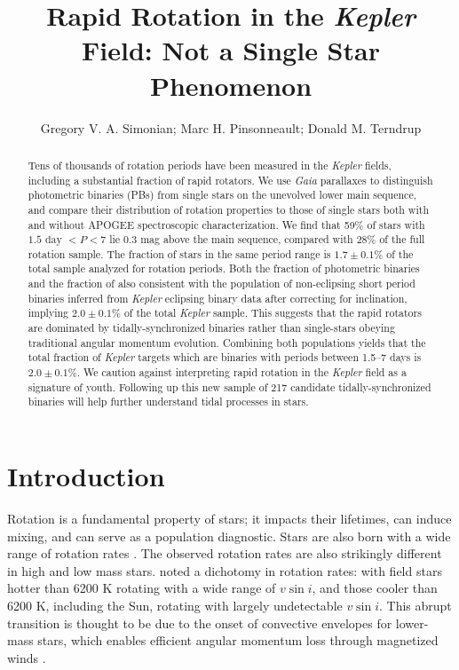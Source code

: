 \documentclass[manuscript]{aastex6}
\newcommand{\vsini}{\ensuremath{v \sin i}}
\newcommand{\Kepler}{\mbox{\textit{Kepler}}}
\newcommand{\Gaia}{\mbox{\textit{Gaia}}}
\begin{document}
\title{Rapid Rotation in the \Kepler{} Field: Not a Single Star
Phenomenon}
\author{Gregory V. A. Simonian; Marc H. Pinsonneault; Donald M. Terndrup}

\begin{abstract}
    Tens of thousands of rotation periods have been measured in the
    \Kepler{} fields, including a substantial fraction of rapid rotators. We 
    use \Gaia{} parallaxes to distinguish photometric binaries (PBs) from
    single stars on the unevolved lower main sequence, and compare their
    distribution of rotation properties to those of single stars both with and 
    without APOGEE spectroscopic characterization. We find that 59\% of stars
    with \(1.5 \textrm{ day } < P < 7\) lie 0.3 mag above the main
    sequence, compared with 28\% of the full rotation sample. The fraction of 
    stars in the same period range is \(1.7 \pm 0.1\%\) of the total sample 
    analyzed for rotation periods. Both the fraction of photometric binaries
    and the fraction of  also consistent with the population of non-eclipsing short period 
    binaries inferred from \Kepler{} eclipsing binary data after correcting for 
    inclination, implying \(2.0 \pm 0.1\%\) of the total \Kepler{} sample. This suggests that the rapid rotators 
    are dominated by tidally-synchronized binaries rather than single-stars 
    obeying traditional angular momentum evolution. Combining both populations
    yields that the total fraction of \Kepler{} targets which are binaries with 
    periods between 1.5--7 days is \(2.0 \pm 0.1\%\). We caution against 
    interpreting rapid rotation in the \Kepler{} field as a signature of youth. 
    Following up this new sample of 217 candidate tidally-synchronized binaries 
    will help further understand tidal processes in stars.
\end{abstract}

\section{Introduction}

Rotation is a fundamental property of stars; it impacts their lifetimes, can
induce mixing, and can serve as a population diagnostic. Stars are also born 
with a wide range of rotation rates \citep{Attridge92, Herbst00, Henderson12}.
The observed rotation rates are also strikingly different in high and low mass 
stars. \citet{Kraft67} noted a dichotomy in rotation rates: with field stars 
hotter than 6200 K rotating with a wide range of \vsini, and those cooler than 
6200 K, including the Sun, rotating with largely undetectable \vsini. This abrupt transition is thought to
be due to the onset of convective envelopes for lower-mass stars, which 
enables efficient angular momentum loss through magnetized winds 
\citep{Parker58,Weber67}.
\end{document}

